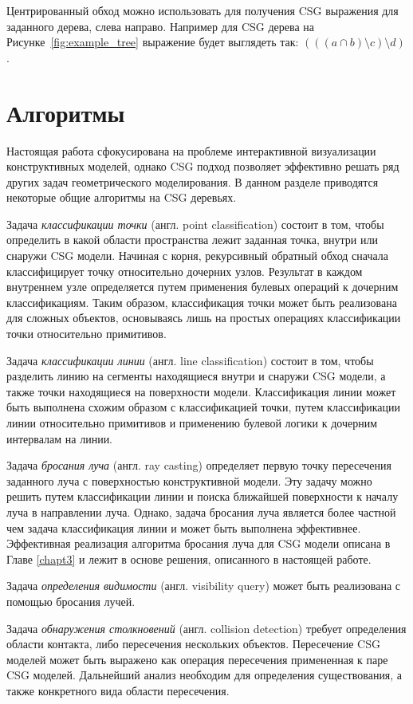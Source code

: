 Центрированный обход можно использовать для получения CSG выражения для заданного дерева, слева направо. Например для CSG дерева на Рисунке~\ref{fig:example_tree} выражение будет выглядеть так: $(((a \cap b) \setminus c) \setminus d)$.

\section{Алгоритмы} \label{sect_csg_algo}

Настоящая работа сфокусирована на проблеме интерактивной визуализации конструктивных моделей, однако CSG подход позволяет эффективно решать ряд других задач геометрического моделирования. В данном разделе приводятся некоторые общие алгоритмы на CSG деревьях.

Задача \textit{классификации точки} (англ. point classification) состоит в том, чтобы определить в какой области пространства лежит заданная точка, внутри или снаружи CSG модели. Начиная с корня, рекурсивный обратный обход сначала классифицирует точку относительно дочерних узлов. Результат в каждом внутреннем узле определяется путем применения булевых операций к дочерним классификациям. Таким образом, классификация точки может быть реализована для сложных объектов, основываясь лишь на простых операциях классификации точки относительно примитивов.

Задача \textit{классификации линии} (англ. line classification) состоит в том, чтобы разделить линию на сегменты находящиеся внутри и снаружи CSG модели, а также точки находящиеся на поверхности модели. Классификация линии может быть выполнена схожим образом с классификацией точки, путем классификации линии относительно примитивов и применению булевой логики к дочерним интервалам на линии.

Задача \textit{бросания луча} (англ. ray casting) определяет первую точку пересечения заданного луча с поверхностью конструктивной модели. Эту задачу можно решить путем классификации линии и поиска ближайшей поверхности к началу луча в направлении луча. Однако, задача бросания луча является более частной чем задача классификация линии и может быть выполнена эффективнее. Эффективная реализация алгоритма бросания луча для CSG модели описана в Главе \ref{chapt3} и лежит в основе решения, описанного в настоящей работе.

Задача \textit{определения видимости} (англ. visibility query) может быть реализована с помощью бросания лучей.

Задача \textit{обнаружения столкновений} (англ. collision detection) требует определения области контакта, либо пересечения нескольких объектов. Пересечение CSG моделей может быть выражено как операция пересечения примененная к паре CSG моделей. Дальнейший анализ необходим для определения существования, а также конкретного вида области пересечения.

